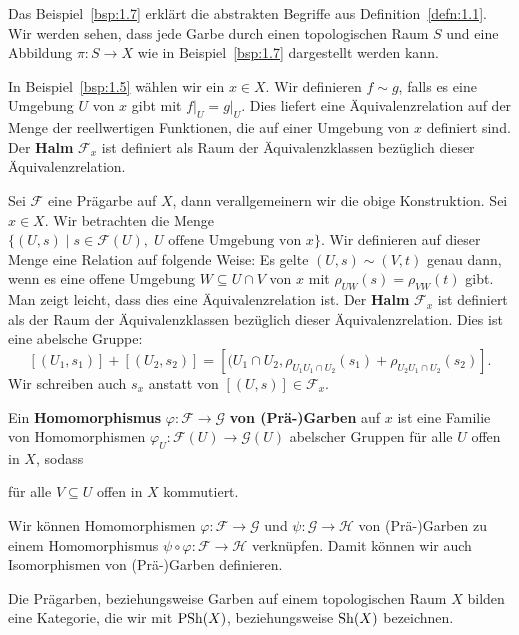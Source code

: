 \begin{bem}
	Das Beispiel~\ref{bsp:1.7} erklärt die abstrakten Begriffe aus Definition~\ref{defn:1.1}. Wir werden sehen, dass jede Garbe durch einen topologischen Raum $S$ und eine Abbildung $\pi\colon S \to X$ wie in Beispiel~\ref{bsp:1.7} dargestellt werden kann.
\end{bem}

\begin{bsp}
	In Beispiel~\ref{bsp:1.5} wählen wir ein $x \in X$. Wir definieren $f\sim g$, falls es eine Umgebung $U$ von $x$ gibt mit $f\vert_U = g\vert_U$. Dies liefert eine Äquivalenzrelation auf der Menge der reellwertigen Funktionen, die auf einer Umgebung von $x$ definiert sind. Der \textbf{Halm} $\mathcal{F}_x$ ist definiert als Raum der Äquivalenzklassen bezüglich dieser Äquivalenzrelation.
\end{bsp}

\begin{defn}
	Sei $\mathcal{F}$ eine Prägarbe auf $X$, dann verallgemeinern wir die obige Konstruktion. Sei $x \in X$. Wir betrachten die Menge $\{(U,s)\mid s \in \mathcal{F}(U),\; U \text{ offene Umgebung von } x\}$. Wir definieren auf dieser Menge eine Relation auf folgende Weise: Es gelte	$(U,s) \sim (V,t)$ genau dann, wenn es eine offene Umgebung $W\subseteq U \cap V$ von $x$ mit $\rho_{UW}(s) = \rho_{VW}(t)$ gibt. Man zeigt leicht, dass dies eine Äquivalenzrelation ist. Der \textbf{Halm} $\mathcal{F}_x$ ist definiert als der Raum der Äquivalenzklassen bezüglich dieser Äquivalenzrelation. Dies ist eine abelsche Gruppe:
	\[
		[(U_1,s_1)] + [(U_2,s_2)] = [(U_1 \cap U_2, \rho_{U_1U_1\cap U_2}(s_1) + \rho_{U_2U_1\cap U_2}(s_2)].
	\]
	Wir schreiben auch $s_x$ anstatt von $[(U,s)] \in \mathcal{F}_x$.
\end{defn}


\begin{defn}
	Ein \textbf{Homomorphismus} $\varphi \colon \mathcal{F} \to \mathcal{G}$ \textbf{von (Prä-)Garben} auf $x$ ist eine Familie von Homomorphismen $\varphi_U \colon \mathcal{F}(U) \to \mathcal{G}(U)$ abelscher Gruppen für alle $U$ offen in $X$, sodass
	\begin{center}
	\end{center}
	für alle $V \subseteq U$ offen in $X$ kommutiert.

	Wir können Homomorphismen $\varphi \colon \mathcal{F}\to \mathcal{G}$ und $\psi \colon \mathcal{G} \to \mathcal{H}$ von (Prä-)Garben zu einem Homomorphismus $\psi\circ \varphi \colon \mathcal{F} \to \mathcal{H}$ verknüpfen. Damit können wir auch Isomorphismen von (Prä-)Garben definieren.

	Die Prägarben, beziehungsweise Garben auf einem topologischen Raum $X$ bilden eine Kategorie, die wir mit $\operatorname{PSh}(X)$, beziehungsweise $\operatorname{Sh}(X)$ bezeichnen.
\end{defn}

